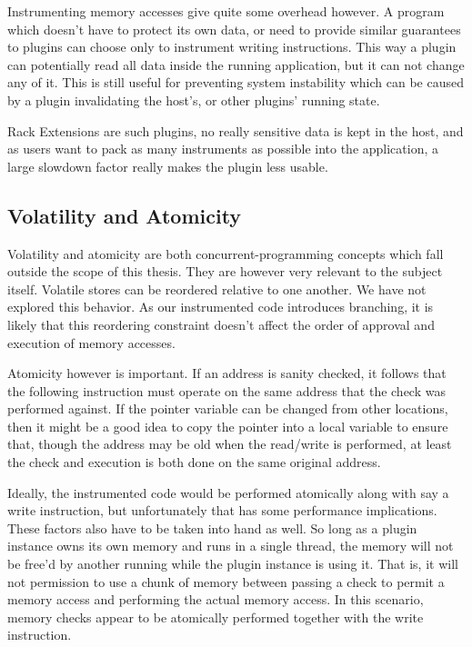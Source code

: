 Instrumenting memory accesses give quite some overhead however. A program which
doesn't have to protect its own data, or need to provide similar guarantees to
plugins can choose only to instrument writing instructions. This way a plugin
can potentially read all data inside the running application, but it can not
change any of it. This is still useful for preventing system instability which
can be caused by a plugin invalidating the host's, or other plugins' running
state.

Rack Extensions are such plugins, no really sensitive data is kept in the host,
and as users want to pack as many instruments as possible into the application,
a large slowdown factor really makes the plugin less usable.

\subsection {Volatility and Atomicity}

Volatility and atomicity are both concurrent-programming concepts which fall
outside the scope of this thesis. They are however very relevant to the subject
itself. Volatile stores can be reordered relative to one another. We have not
explored this behavior. As our instrumented code introduces branching, it is
likely that this reordering constraint doesn't affect the order of approval and
execution of memory accesses.

Atomicity however is important. If an address is sanity checked, it follows that
the following instruction must operate on the same address that the check was
performed against. If the pointer variable can be changed from other locations,
then it might be a good idea to copy the pointer into a local variable to ensure
that, though the address may be old when the read/write is performed, at least
the check and execution is both done on the same original address.

Ideally, the instrumented code would be performed atomically along with say a
write instruction, but unfortunately that has some performance implications.
These factors also have to be taken into hand as well. So long as a plugin
instance owns its own memory and runs in a single thread, the memory will not be
free'd by another running while the plugin instance is using it. That is, it
will not permission to use a chunk of memory between passing a check to permit a
memory access and performing the actual memory access. In this scenario, memory
checks appear to be atomically performed together with the write instruction.

